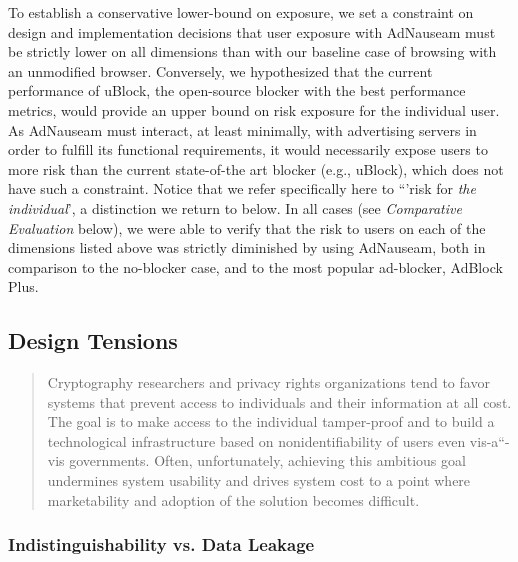 \documentclass[conference]{IEEEtran}
\begin{document}
To establish a conservative lower-bound on exposure, we set a constraint on design and implementation decisions that user exposure with AdNauseam must be strictly lower on all dimensions than with our baseline case of browsing with an unmodified browser. Conversely, we hypothesized that the current performance of uBlock, the open-source blocker with the best performance metrics, would provide an upper bound on risk exposure for the individual user. As AdNauseam must interact, at least minimally, with advertising servers in order to fulfill its functional requirements, it would necessarily expose users to more risk than the current state-of-the art blocker (e.g., uBlock), which does not have such a constraint. Notice that we refer specifically here to “'risk for \emph{the individual}', a distinction we return to below. In all cases (see \emph{Comparative Evaluation} below), we were able to verify that the risk to users on each of the dimensions listed above was strictly diminished by using AdNauseam, both in comparison to the no-blocker case, and to the most popular ad-blocker, AdBlock Plus\cite{PageFair}.

\subsection{Design Tensions}

\blockquote{Cryptography researchers and privacy rights organizations tend to favor systems that prevent access to individuals and their information at all cost. The goal is to make access to the individual tamper-proof and to build a technological infrastructure based on nonidentifiability of users even vis-a“-vis governments. Often, unfortunately, achieving this ambitious goal undermines system usability and drives system cost to a point where marketability and adoption of the solution becomes difficult.\cite{Spiekermann}}

\subsubsection{Indistinguishability vs. Data Leakage}
\end{document}
